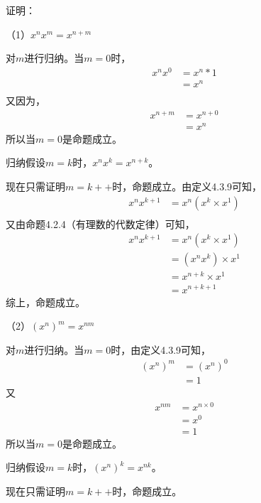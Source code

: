 \documentclass{article}
\theoremstyle{mystyle}
\begin{document}
证明：

（1）$x^n x^m = x^{n+m}$

对$m$进行归纳。当$m=0$时，
\begin{align*}
  x^n x^0 & = x^n * 1 \\
          & = x^n     \\
\end{align*}
又因为，
\begin{align*}
  x^{n+m} & = x^{n+0} \\
          & = x^n
\end{align*}
所以当$m=0$是命题成立。

归纳假设$m=k$时，$x^n x^k = x^{n+k}$。

现在只需证明$m=k++$时，命题成立。由定义4.3.9可知，
\begin{align*}
  x^n x^{k+1} & = x^n (x^k \times x^1) \\
\end{align*}
又由命题4.2.4（有理数的代数定律）可知，
\begin{align*}
  x^n x^{k+1} & = x^n (x^k \times x^1) \\
              & = (x^n x^k) \times x^1 \\
              & = x^{n+k} \times x^1   \\
              & = x^{n+k+1}
\end{align*}
综上，命题成立。

（2）$(x^n)^m = x^{nm}$

对$m$进行归纳。当$m=0时$，由定义4.3.9可知，
\begin{align*}
  (x^n)^m & = (x^n)^0 \\
          & = 1
\end{align*}
又
\begin{align*}
  x^{nm} & = x^{n \times 0} \\
         & = x^0            \\
         & = 1
\end{align*}
所以当$m=0$是命题成立。

归纳假设$m=k$时，$(x^n)^k = x^{nk}$。

现在只需证明$m=k++$时，命题成立。
\begin{align*}
  
\end{align*}
\end{document}

